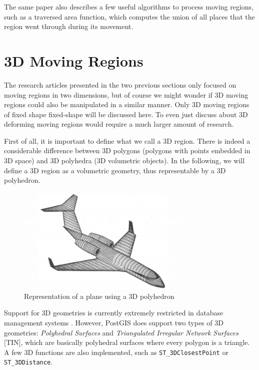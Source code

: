 The same paper \cite{fmregion} also describes a few useful algorithms to process moving regions, such as a traversed area function, which computes the union of all places that the region went through during its movement.

\section{3D Moving Regions}
\label{section:3d_regions_intro}

The research articles presented in the two previous sections only focused on moving regions in two dimensions, but of course we might wonder if 3D moving regions could also be manipulated in a similar manner. Only 3D moving regions of fixed shape fixed-shape will be discussed here. To even just discuss about 3D deforming moving regions would require a much larger amount of research.

First of all, it is important to define what we call a 3D region. There is indeed a considerable difference between 3D polygons (polygons with points embedded in 3D space) and 3D polyhedra (3D volumetric objects). In the following, we will define a 3D region as a volumetric geometry, thus representable by a 3D polyhedron.

\begin{figure}[h!]
    \centering
    \includegraphics[width=0.75\textwidth]{images/plane_polyhedron.png}
    \caption[Representation of a plane using a 3D polyhedron]{Representation of a plane using a 3D polyhedron \cite{3d_polyhedron}}
    \label{fig:polyhedron}
\end{figure}


Support for 3D geometries is currently extremely restricted in database management systems \cite{3d_geom}. However, PostGIS does support two types of 3D geometries: \textit{Polyhedral Surfaces} and \textit{Triangulated Irregular Network Surfaces} [TIN], which are basically polyhedral surfaces where every polygon is a triangle. A few 3D functions are also implemented, such as \lstinline{ST_3DClosestPoint} or \lstinline{ST_3DDistance}.

